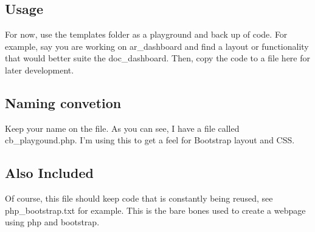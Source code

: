 \subsection*{Usage}

For now, use the templates folder as a playground and back up of code. For example, say you are working on ar\-\_\-dashboard and find a layout or functionality that would better suite the doc\-\_\-dashboard. Then, copy the code to a file here for later development.

\subsection*{Naming convetion}

Keep your name on the file. As you can see, I have a file called cb\-\_\-playgound.\-php. I'm using this to get a feel for Bootstrap layout and C\-S\-S.

\subsection*{Also Included}

Of course, this file should keep code that is constantly being reused, see php\-\_\-bootstrap.\-txt for example. This is the bare bones used to create a webpage using php and bootstrap. 